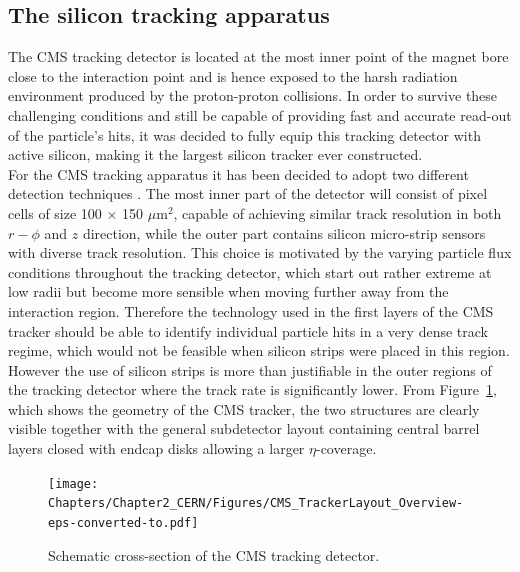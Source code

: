 \subsection{The silicon tracking apparatus}\label{sec::Tracker}
The CMS tracking detector is located at the most inner point of the magnet bore close to the interaction point and is hence exposed to the harsh radiation environment produced by the proton-proton collisions. In order to survive these challenging conditions and still be capable of providing fast and accurate read-out of the particle's hits, it was decided to fully equip this tracking detector with active silicon, making it the largest silicon tracker ever constructed.
\\
For the CMS tracking apparatus it has been decided to adopt two different detection techniques .
The most inner part of the detector will consist of pixel cells of size 100 $\times$ 150 $\mu$m$^{2}$, capable of achieving similar track resolution in both $r-\phi$ and $z$ direction, while the outer part contains silicon micro-strip sensors with diverse track resolution. 
This choice is motivated by the varying particle flux conditions throughout the tracking detector, which start out rather extreme at low radii but become more sensible when moving further away from the interaction region. 
Therefore the technology used in the first layers of the CMS tracker should be able to identify individual particle hits in a very dense track regime, which would not be feasible when silicon strips were placed in this region. However the use of silicon strips is more than justifiable in the outer regions of the tracking detector where the track rate is significantly lower.
From Figure~\ref{fig::CMSTracker}, which shows the geometry of the CMS tracker, the two structures are clearly visible together with the general subdetector layout containing central barrel layers closed with endcap disks allowing a larger $\eta$-coverage.
\begin{figure}[h!t]
 \centering
 \texttt{[image: Chapters/Chapter2\_CERN/Figures/CMS\_TrackerLayout\_Overview-eps-converted-to.pdf]}
 \caption{Schematic cross-section of the CMS tracking detector.} \label{fig::CMSTracker}
\end{figure}


